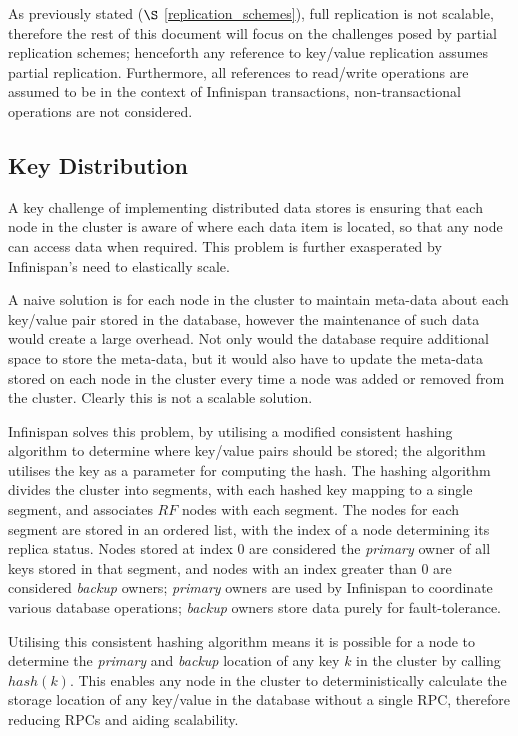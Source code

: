 As previously stated ($\S$ \ref{replication_schemes}), full replication is not scalable, therefore the rest of this document will focus on the challenges posed by partial replication schemes; henceforth any reference to key/value replication assumes partial replication.  Furthermore, all references to read/write operations are assumed to be in the context of Infinispan transactions, non-transactional operations are not considered.  

    \subsection{Key Distribution}
    A key challenge of implementing distributed data stores is ensuring that each node in the cluster is aware of where each data item is located, so that any node can access data when required.  This problem is further exasperated by Infinispan's need to elastically scale.  
    
    A naive solution is for each node in the cluster to maintain meta-data about each key/value pair stored in the database, however the maintenance of such data would create a large overhead.  Not only would the database require additional space to store the meta-data, but it would also have to update the meta-data stored on each node in the cluster every time a node was added or removed from the cluster.  Clearly this is not a scalable solution.  
    
    Infinispan solves this problem, by utilising a modified consistent hashing algorithm\citep{Karger:1997:CHR:258533.258660, Infinispan, Ruivo:2011:ETO:2120967.2121604} to determine where key/value pairs should be stored; the algorithm utilises the key as a parameter for computing the hash.  The hashing algorithm divides the cluster into segments, with each hashed key mapping to a single segment, and associates $RF$ nodes with each segment. The nodes for each segment are stored in an ordered list, with the index of a node determining its replica status.  Nodes stored at index 0 are considered the \emph{primary} owner of all keys stored in that segment, and nodes with an index greater than 0 are considered \emph{backup} owners; \emph{primary} owners are used by Infinispan to coordinate various database operations; \emph{backup} owners store data purely for fault-tolerance.  
 
    Utilising this consistent hashing algorithm means it is possible for a node to determine the \emph{primary} and \emph{backup} location of any key $k$ in the cluster by calling $hash(k)$. This enables any node in the cluster to deterministically calculate the storage location of any key/value in the database without a single RPC, therefore reducing RPCs and aiding scalability.  
    
